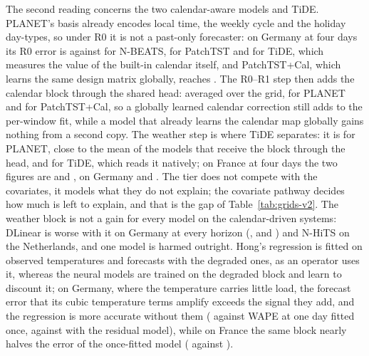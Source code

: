 The second reading concerns the two calendar-aware models and TiDE. PLANET's basis already
encodes local time, the weekly cycle and the holiday day-types, so under R0 it is not a
past-only forecaster: on Germany at four days its R0 error is 
against  for N-BEATS,  for
PatchTST and  for TiDE, which measures the value of the built-in
calendar itself, and PatchTST+Cal, which learns the same design matrix globally, reaches
. The R0--R1 step then adds the calendar block through the shared head: averaged over the
grid,  for PLANET and
 for PatchTST+Cal, so a globally learned calendar
correction still adds to the per-window fit, while a model that already learns the calendar
map globally gains nothing from a second copy. The weather step is where TiDE separates: it is
 for PLANET, close to the
 mean of the models that receive the block through the
head, and  for TiDE, which reads it natively; on
France at four days the two figures are  and
, on Germany
 and
. The tier does not compete with the covariates,
it models what they do not explain; the covariate pathway decides how much is left to explain,
and that is the gap of Table~\ref{tab:grids-v2}. The weather block is not a gain for every model on the calendar-driven systems: DLinear is
worse with it on Germany at every horizon (,
 and
) and N-HiTS on the Netherlands, and one
model is harmed outright. Hong's regression is fitted on observed temperatures and forecasts with the degraded ones, as an
operator uses it, whereas the neural models are trained on the degraded block and learn to
discount it; on Germany, where the temperature carries little load, the forecast error that
its cubic temperature terms amplify exceeds the signal they add, and the regression is more
accurate without them ( against
 WAPE at one day fitted once,
 against  with the
residual model), while on France the same block nearly halves the error of the once-fitted
model ( against ).

